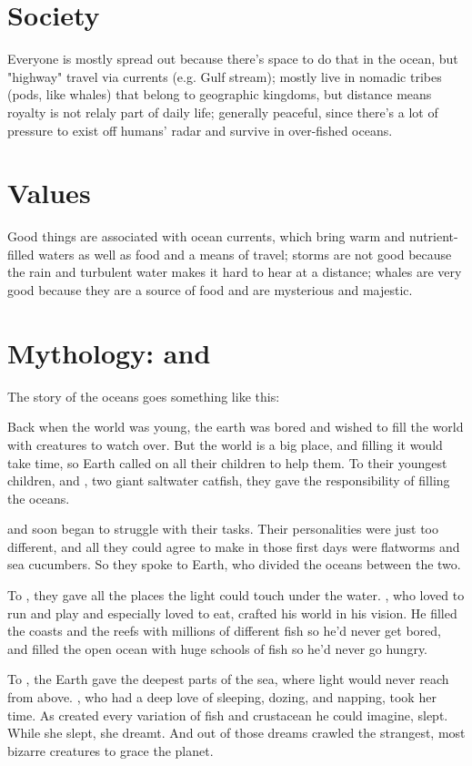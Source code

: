 \documentclass[11pt]{report}
\begin{document}
\section{Society}
Everyone is mostly spread out because there's space to do that in the ocean, but "highway" travel via currents (e.g. Gulf stream); mostly live in nomadic tribes (pods, like whales) that belong to geographic kingdoms, but distance means royalty is not relaly part of daily life; generally peaceful, since there's a lot of pressure to exist off humans' radar and survive in over-fished oceans.

\section{Values}
Good things are associated with ocean currents, which bring warm and nutrient-filled waters as well as food and a means of travel; storms are not good because the rain and turbulent water makes it hard to hear at a distance; whales are very good because they are a source of food and are mysterious and majestic.

\section{Mythology:  and }
The story of the oceans goes something like this:

Back when the world was young, the earth was bored and wished to fill the world with creatures to watch over.  But the world is a big place, and filling it would take time, so Earth called on all their children to help them.  To their youngest children,  and , two giant saltwater catfish, they gave the responsibility of filling the oceans.

 and  soon began to struggle with their tasks.  Their personalities were just too different, and all they could agree to make in those first days were flatworms and sea cucumbers. So they spoke to Earth, who divided the oceans between the two.

To , they gave all the places the light could touch under the water.  , who loved to run and play and especially loved to eat, crafted his world in his vision.  He filled the coasts and the reefs with millions of different fish so he'd never get bored, and filled the open ocean with huge schools of fish so he'd never go hungry.

To , the Earth gave the deepest parts of the sea, where light would never reach from above.  , who had a deep love of sleeping, dozing, and napping, took her time.  As  created every variation of fish and crustacean he could imagine,  slept.  While she slept, she dreamt.  And out of those dreams crawled the strangest, most bizarre creatures to grace the planet.
\end{document}
